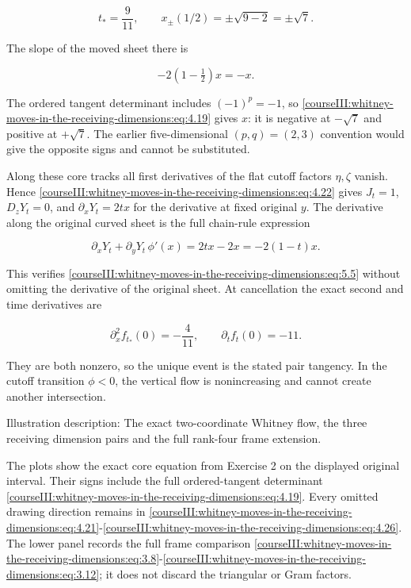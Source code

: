 \begin{equation}
t_*=\frac{9}{11},\qquad
 x_\pm(1/2)=\pm\sqrt{9-2}=\pm\sqrt7.
 \label{courseIII:whitney-moves-in-the-receiving-dimensions:eq:5.4}
\end{equation}

The slope of the moved sheet there is

\begin{equation}
-2(1-\tfrac12)x=-x.
 \label{courseIII:whitney-moves-in-the-receiving-dimensions:eq:5.5}
\end{equation}

The ordered tangent determinant includes \((-1)^p=-1\), so \eqref{courseIII:whitney-moves-in-the-receiving-dimensions:eq:4.19} gives \(x\): it is negative at \(-\sqrt7\) and positive at \(+\sqrt7\). The earlier five-dimensional \((p,q)=(2,3)\) convention would give the opposite signs and cannot be substituted.

Along these core tracks all first derivatives of the flat cutoff factors \(\eta,\zeta\) vanish. Hence \eqref{courseIII:whitney-moves-in-the-receiving-dimensions:eq:4.22} gives \(J_t=1\), \(D_zY_t=0\), and \(\partial_xY_t=2tx\) for the derivative at fixed original \(y\). The derivative along the original curved sheet is the full chain-rule expression

\begin{equation}
\partial_xY_t+\partial_yY_t\,\phi'(x)
       =2tx-2x=-2(1-t)x.
 \label{courseIII:whitney-moves-in-the-receiving-dimensions:eq:5.6}
\end{equation}

This verifies \eqref{courseIII:whitney-moves-in-the-receiving-dimensions:eq:5.5} without omitting the derivative of the original sheet. At cancellation the exact second and time derivatives are

\begin{equation}
\partial_x^2 f_{t_*}(0)=-\frac4{11},\qquad
 \partial_t f_t(0)=-11.
 \label{courseIII:whitney-moves-in-the-receiving-dimensions:eq:5.7}
\end{equation}

They are both nonzero, so the unique event is the stated pair tangency. In the cutoff transition \(\phi<0\), the vertical flow is nonincreasing and cannot create another intersection.

Illustration description: The exact two-coordinate Whitney flow, the three receiving dimension pairs and the full rank-four frame extension.

The plots show the exact core equation from Exercise 2 on the displayed original interval. Their signs include the full ordered-tangent determinant \eqref{courseIII:whitney-moves-in-the-receiving-dimensions:eq:4.19}. Every omitted drawing direction remains in \eqref{courseIII:whitney-moves-in-the-receiving-dimensions:eq:4.21}-\eqref{courseIII:whitney-moves-in-the-receiving-dimensions:eq:4.26}. The lower panel records the full frame comparison \eqref{courseIII:whitney-moves-in-the-receiving-dimensions:eq:3.8}-\eqref{courseIII:whitney-moves-in-the-receiving-dimensions:eq:3.12}; it does not discard the triangular or Gram factors.

